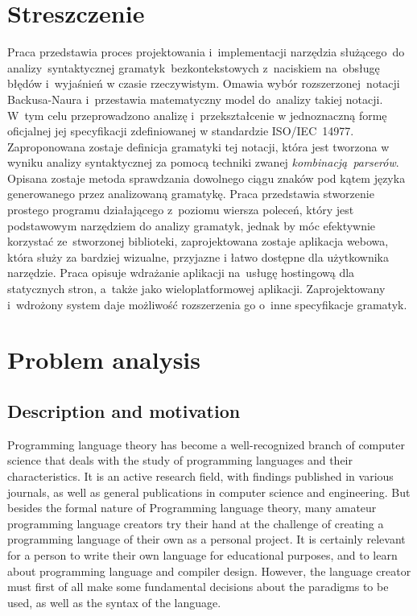 \documentclass[english,engineering]{wizthesis}
\begin{document}
{\let\clearpage\relax %
\chapter*{Streszczenie}

Praca przedstawia proces projektowania i~implementacji narzędzia służącego~do
analizy~syntaktycznej gramatyk~bezkontekstowych z~naciskiem na~obsługę błędów
i~wyjaśnień w czasie rzeczywistym. Omawia wybór rozszerzonej~notacji
Backusa-Naura i~przestawia matematyczny model do~analizy takiej notacji. W~tym
celu przeprowadzono analizę i~przekształcenie w jednoznaczną formę oficjalnej
jej specyfikacji zdefiniowanej w standardzie ISO/IEC~14977. Zaproponowana
zostaje definicja gramatyki tej notacji, która jest tworzona w wyniku analizy
syntaktycznej za pomocą techniki zwanej \emph{kombinacją~parserów}. Opisana
zostaje metoda sprawdzania dowolnego ciągu znaków pod kątem języka generowanego
przez analizowaną gramatykę. Praca przedstawia stworzenie prostego programu
działającego z~poziomu wiersza poleceń, który jest podstawowym narzędziem do
analizy gramatyk, jednak by móc efektywnie korzystać ze~stworzonej biblioteki,
zaprojektowana zostaje aplikacja webowa, która służy za bardziej wizualne,
przyjazne i łatwo dostępne dla użytkownika narzędzie. Praca opisuje wdrażanie
aplikacji na~usługę hostingową dla statycznych stron, a~także jako
wieloplatformowej aplikacji. Zaprojektowany i~wdrożony system daje możliwość
rozszerzenia go o~inne specyfikacje gramatyk.}

\tableofcontents

\mainmatter %

\chapter{Problem analysis}

\section{Description and motivation} \label{sec:description-and-motivation}

Programming language theory has become a well-recognized branch of computer
science that deals with the study of programming languages and their
characteristics. It is an active research field, with findings published in
various journals, as well as general publications in computer science and
engineering. But besides the formal nature of Programming language theory, many
amateur programming language creators try their hand at the challenge of
creating a programming language of their own as a personal project. It is
certainly relevant for a person to write their own language for educational
purposes, and to learn about programming language and compiler design. However,
the language creator must first of all make some fundamental decisions about the
paradigms to be used, as well as the syntax of the language.
\end{document}
